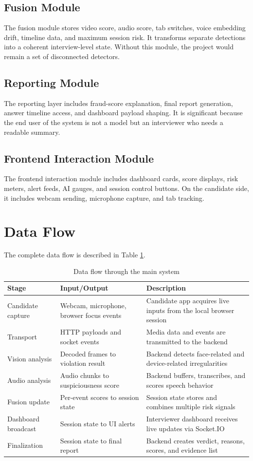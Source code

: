 \documentclass[12pt,a4paper]{extreport}
\begin{document}
\subsection{Fusion Module}
The fusion module stores video score, audio score, tab switches, voice embedding drift, timeline data, and maximum session risk. It transforms separate detections into a coherent interview-level state. Without this module, the project would remain a set of disconnected detectors.

\subsection{Reporting Module}
The reporting layer includes fraud-score explanation, final report generation, answer timeline access, and dashboard payload shaping. It is significant because the end user of the system is not a model but an interviewer who needs a readable summary.

\subsection{Frontend Interaction Module}
The frontend interaction module includes dashboard cards, score displays, risk meters, alert feeds, AI gauges, and session control buttons. On the candidate side, it includes webcam sending, microphone capture, and tab tracking.

\section{Data Flow}
The complete data flow is described in Table \ref{tab:data_flow}.

\begin{table}[H]
\centering
\caption{Data flow through the main system}
\label{tab:data_flow}
\begin{tabularx}{\textwidth}{p{3cm}p{3.2cm}X}
\toprule
\textbf{Stage} & \textbf{Input/Output} & \textbf{Description}\\
\midrule
Candidate capture & Webcam, microphone, browser focus events & Candidate app acquires live inputs from the local browser session\\
Transport & HTTP payloads and socket events & Media data and events are transmitted to the backend\\
Vision analysis & Decoded frames to violation result & Backend detects face-related and device-related irregularities\\
Audio analysis & Audio chunks to suspiciousness score & Backend buffers, transcribes, and scores speech behavior\\
Fusion update & Per-event scores to session state & Session state stores and combines multiple risk signals\\
Dashboard broadcast & Session state to UI alerts & Interviewer dashboard receives live updates via Socket.IO\\
Finalization & Session state to final report & Backend creates verdict, reasons, scores, and evidence list\\
\bottomrule
\end{tabularx}
\end{table}
\end{document}
